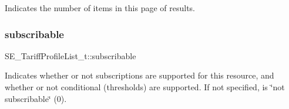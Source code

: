 Indicates the number of items in this page of results. \mbox{\label{group__TariffProfileList_gaa153bac887e9928acdfee8db13723c96}} 
\subsubsection{\texorpdfstring{subscribable}{subscribable}}
{\footnotesize\ttfamily S\+E\+\_\+\+Tariff\+Profile\+List\+\_\+t\+::subscribable}

Indicates whether or not subscriptions are supported for this resource, and whether or not conditional (thresholds) are supported. If not specified, is \char`\"{}not subscribable\char`\"{} (0). 
